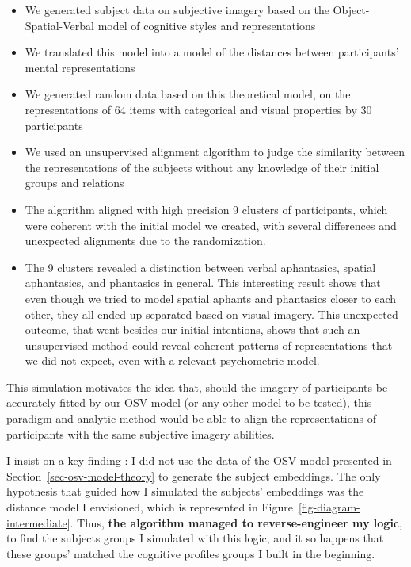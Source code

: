 \documentclass[
  authoryear]{elsarticle}
\begin{document}
\begin{itemize}
\item
  We generated subject data on subjective imagery based on the
  Object-Spatial-Verbal model of cognitive styles and representations
\item
  We translated this model into a model of the distances between
  participants' mental representations
\item
  We generated random data based on this theoretical model, on the
  representations of 64 items with categorical and visual properties by
  30 participants
\item
  We used an unsupervised alignment algorithm to judge the similarity
  between the representations of the subjects without any knowledge of
  their initial groups and relations
\item
  The algorithm aligned with high precision 9 clusters of participants,
  which were coherent with the initial model we created, with several
  differences and unexpected alignments due to the randomization.
\item
  The 9 clusters revealed a distinction between verbal aphantasics,
  spatial aphantasics, and phantasics in general. This interesting
  result shows that even though we tried to model spatial aphants and
  phantasics closer to each other, they all ended up separated based on
  visual imagery. This unexpected outcome, that went besides our initial
  intentions, shows that such an unsupervised method could reveal
  coherent patterns of representations that we did not expect, even with
  a relevant psychometric model.
\end{itemize}

This simulation motivates the idea that, should the imagery of
participants be accurately fitted by our OSV model (or any other model
to be tested), this paradigm and analytic method would be able to align
the representations of participants with the same subjective imagery
abilities.

I insist on a key finding : I did not use the data of the OSV model
presented in Section~\ref{sec-osv-model-theory} to generate the subject
embeddings. The only hypothesis that guided how I simulated the
subjects' embeddings was the distance model I envisioned, which is
represented in Figure~\ref{fig-diagram-intermediate}. Thus, \textbf{the
algorithm managed to reverse-engineer my logic}, to find the subjects
groups I simulated with this logic, and it so happens that these groups'
matched the cognitive profiles groups I built in the beginning.
\end{document}
